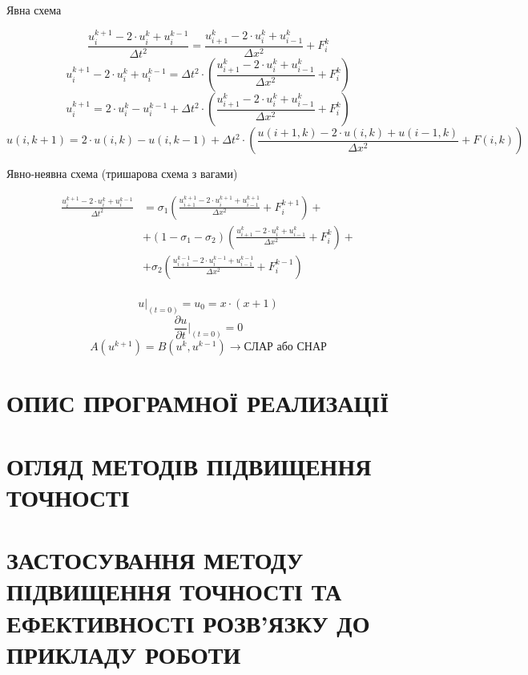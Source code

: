 \documentclass{article}
\begin{document}
        Явна схема

        $$ \frac{u_i^{k+1} - 2 \cdot u_i^{k} + u_i^{k-1}}{\Delta{t}^2} = \frac{u_{i+1}^{k} - 2 \cdot u_i^{k} + u_{i-1}^{k}}{\Delta{x}^2} + F_i^{k} $$
        $$ u_i^{k+1} - 2 \cdot u_i^{k} + u_i^{k-1} = \Delta{t}^2 \cdot \left( \frac{u_{i+1}^{k} - 2 \cdot u_i^{k} + u_{i-1}^{k}}{\Delta{x}^2} + F_i^{k} \right) $$
        $$ u_i^{k+1} = 2 \cdot u_i^{k} - u_i^{k-1} + \Delta{t}^2 \cdot \left( \frac{u_{i+1}^{k} - 2 \cdot u_i^{k} + u_{i-1}^{k}}{\Delta{x}^2} + F_i^{k} \right) $$
        $$ u(i, k+1) = 2 \cdot u(i, k) - u(i, k-1) + \Delta{t}^2 \cdot \left( \frac{u(i+1, k) - 2 \cdot u(i, k) + u(i-1, k)}{\Delta{x}^2} + F(i, k) \right) $$

        Явно-неявна схема (тришарова схема з вагами)

        \begin{equation*}
            \begin{split}
                \frac{u_i^{k+1} - 2 \cdot u_i^{k} + u_i^{k-1}}{\Delta{t}^2} & = \sigma_1 \left( \frac{u_{i+1}^{k+1} - 2 \cdot u_i^{k+1} + u_{i-1}^{k+1}}{\Delta{x}^2} + F_i^{k+1} \right) +\\
                & + (1 - \sigma_1 - \sigma_2) \left( \frac{u_{i+1}^{k} - 2 \cdot u_i^{k} + u_{i-1}^{k}}{\Delta{x}^2} + F_i^{k} \right) +\\
                & + \sigma_2 \left( \frac{u_{i+1}^{k-1} - 2 \cdot u_i^{k-1} + u_{i-1}^{k-1}}{\Delta{x}^2} + F_i^{k-1} \right)\\
            \end{split}
        \end{equation*}

        $$ u \vert_{(t = 0)} = u_0 = x \cdot (x+1) $$
        $$ \frac{\partial{u}}{\partial{t}} \vert_{(t = 0)} = 0 $$
        $$ A\left(u^{k+1}\right) = B\left(u^k, u^{k-1}\right) \rightarrow \text{СЛАР або СНАР} $$

    \newpage
    \section{ОПИС ПРОГРАМНОЇ РЕАЛИЗАЦІЇ}
    \newpage
    \section{ОГЛЯД МЕТОДІВ ПІДВИЩЕННЯ ТОЧНОСТІ}
    \newpage
    \section{ЗАСТОСУВАННЯ МЕТОДУ ПІДВИЩЕННЯ ТОЧНОСТІ ТА ЕФЕКТИВНОСТІ РОЗВ’ЯЗКУ ДО ПРИКЛАДУ РОБОТИ}
    \newpage
\end{document}
